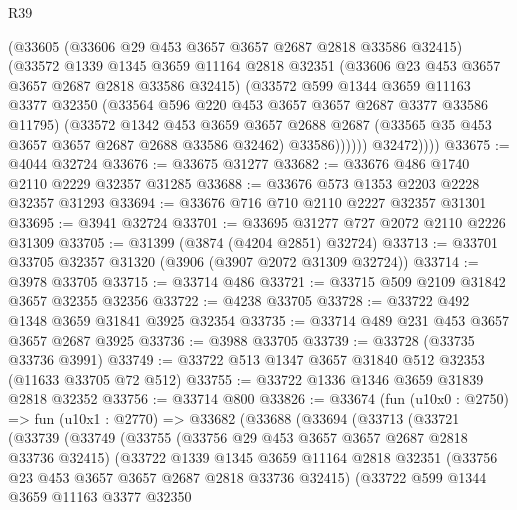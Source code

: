 \begin{lexlean}{R39}
\begin{coremodule}
                (@33605
                  (@33606 @29 @453 @3657 @3657 @2687 @2818 @33586 @32415)
                  (@33572
                    @1339
                    @1345
                    @3659
                    @11164
                    @2818
                    @32351
                    (@33606 @23 @453 @3657 @3657 @2687 @2818 @33586 @32415)
                    (@33572
                      @599
                      @1344
                      @3659
                      @11163
                      @3377
                      @32350
                      (@33564 @596 @220 @453 @3657 @3657 @2687 @3377 @33586 @11795)
                      (@33572
                        @1342
                        @453
                        @3659
                        @3657
                        @2688
                        @2687
                        (@33565 @35 @453 @3657 @3657 @2687 @2688 @33586 @32462)
                        @33586))))))
            @32472))))
@33675 := @4044 @32724
@33676 := @33675 @31277
@33682 := @33676 @486 @1740 @2110 @2229 @32357 @31285
@33688 := @33676 @573 @1353 @2203 @2228 @32357 @31293
@33694 := @33676 @716 @710 @2110 @2227 @32357 @31301
@33695 := @3941 @32724
@33701 := @33695 @31277 @727 @2072 @2110 @2226 @31309
@33705 := @31399 (@3874 (@4204 @2851) @32724)
@33713 := @33701 @33705 @32357 @31320 (@3906 (@3907 @2072 @31309 @32724))
@33714 := @3978 @33705
@33715 := @33714 @486
@33721 := @33715 @509 @2109 @31842 @3657 @32355 @32356
@33722 := @4238 @33705
@33728 := @33722 @492 @1348 @3659 @31841 @3925 @32354
@33735 := @33714 @489 @231 @453 @3657 @3657 @2687 @3925
@33736 := @3988 @33705
@33739 := @33728 (@33735 @33736 @3991)
@33749 := @33722 @513 @1347 @3657 @31840 @512 @32353 (@11633 @33705 @72 @512)
@33755 := @33722 @1336 @1346 @3659 @31839 @2818 @32352
@33756 := @33714 @800
@33826 := @33674
    (fun (u10x0 : @2750) =>
    fun (u10x1 : @2770) =>
    @33682
      (@33688
        (@33694
          (@33713
            (@33721
              (@33739
                (@33749
                  (@33755
                    (@33756 @29 @453 @3657 @3657 @2687 @2818 @33736 @32415)
                    (@33722
                      @1339
                      @1345
                      @3659
                      @11164
                      @2818
                      @32351
                      (@33756 @23 @453 @3657 @3657 @2687 @2818 @33736 @32415)
                      (@33722
                        @599
                        @1344
                        @3659
                        @11163
                        @3377
                        @32350

\end{coremodule}
\end{lexlean}
